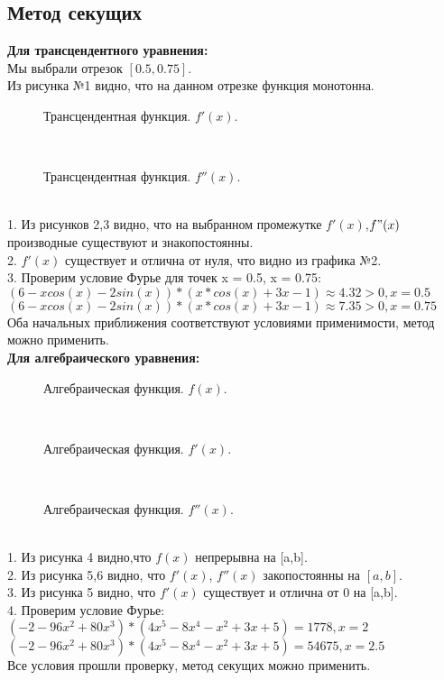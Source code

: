 \documentclass[12pt]{article}
\begin{document}
\subsection{Метод секущих}
\textbf{Для трансцендентного уравнения:}\\ 
Мы выбрали отрезок $[0.5,0.75]$.\\
Из рисунка №1 видно, что на данном отрезке функция монотонна.\\
\begin{figure}[h!]
\caption{Трансцендентная функция. $f'(x)$.}
\end{figure}\\
\begin{figure}[h!]
\caption{Трансцендентная функция. $f''(x)$.}
\end{figure}\\
1. Из рисунков 2,3 видно, что на выбранном промежутке $f'(x)$,$f"(x)$ производные существуют и знакопостоянны.\\
2. $f'(x)$ существует и отлична от нуля, что видно из графика №2.\\
3. Проверим условие Фурье для точек x = 0.5, x = 0.75:\\
$(6 - x cos(x) - 2 sin(x))*(x*cos(x)+3x-1)\approx 4.32 > 0, x = 0.5$\\
$(6 - x cos(x) - 2 sin(x))*(x*cos(x)+3x-1)\approx 7.35 > 0, x = 0.75$\\
Оба начальных приближения соответствуют условиями применимости, метод можно применить.\\
\textbf{Для алгебраического уравнения:}\\
\begin{figure}[h!]
\caption{Алгебраическая функция. $f(x)$.}
\end{figure}\\
\begin{figure}[h!]
\caption{Алгебраическая функция. $f'(x)$.}
\end{figure}\\
\begin{figure}[h!]
\caption{Алгебраическая функция. $f''(x)$.}
\end{figure}\\
1. Из рисунка 4 видно,что $f(x)$ непрерывна на [a,b].\\
2. Из рисунка 5,6 видно, что $f'(x)$, $f''(x)$ закопостоянны на $[a,b]$.\\
3. Из рисунка 5 видно, что $f'(x)$ существует и отлична от 0 на [a,b].\\
4. Проверим условие Фурье:\\
$(-2 - 96 x^2 + 80 x^3)*(4x^5-8x^4-x^2+3x+5) = 1778, x= 2$\\
$(-2 - 96 x^2 + 80 x^3)*(4x^5-8x^4-x^2+3x+5) =54675, x = 2.5$\\
Все условия прошли проверку, метод секущих можно применить.\\
\end{document}
